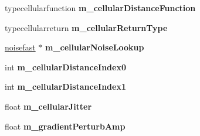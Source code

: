 \begin{DoxyCompactItemize}
\mbox{\label{classnoisefast_a131496549e0ec95deef7c2637b339d41}} 
typecellularfunction {\bfseries m\+\_\+cellular\+Distance\+Function}
\item 
\mbox{\label{classnoisefast_a9c5a3186d01c713c4a3f7e64044b4c7a}} 
typecellularreturn {\bfseries m\+\_\+cellular\+Return\+Type}
\item 
\mbox{\label{classnoisefast_ab02a8b18762496e1b204be7221cfc8f6}} 
\hyperlink{classnoisefast}{noisefast} $\ast$ {\bfseries m\+\_\+cellular\+Noise\+Lookup}
\item 
\mbox{\label{classnoisefast_a84026d4886a27f9f1253afdd2ccb6f01}} 
int {\bfseries m\+\_\+cellular\+Distance\+Index0}
\item 
\mbox{\label{classnoisefast_a4595c3af47f8fbe381f762e00c1aff65}} 
int {\bfseries m\+\_\+cellular\+Distance\+Index1}
\item 
\mbox{\label{classnoisefast_a62c20e623cdba0536c48ad631cbba18b}} 
float {\bfseries m\+\_\+cellular\+Jitter}
\item 
\mbox{\label{classnoisefast_a11d97dd2716ca62ba351d106a8d5f0c4}} 
float {\bfseries m\+\_\+gradient\+Perturb\+Amp}
\end{DoxyCompactItemize}
